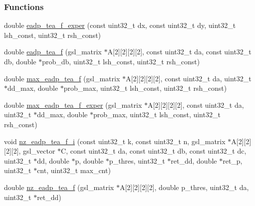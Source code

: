 \subsubsection*{\-Functions}
\begin{DoxyCompactItemize}
\item 
double \hyperlink{eadp-tea-f_8cc_ae0d8d129c4fcabd34fae362f4785cca2}{eadp\-\_\-tea\-\_\-f\-\_\-exper} (const uint32\-\_\-t dx, const uint32\-\_\-t dy, uint32\-\_\-t lsh\-\_\-const, uint32\-\_\-t rsh\-\_\-const)
\item 
double \hyperlink{eadp-tea-f_8cc_a2b46cad5e0dd22f116160ef8fde6e15f}{eadp\-\_\-tea\-\_\-f} (gsl\-\_\-matrix $\ast$\-A\mbox{[}2\mbox{]}\mbox{[}2\mbox{]}\mbox{[}2\mbox{]}\mbox{[}2\mbox{]}, const uint32\-\_\-t da, const uint32\-\_\-t db, double $\ast$prob\-\_\-db, uint32\-\_\-t lsh\-\_\-const, uint32\-\_\-t rsh\-\_\-const)
\item 
double \hyperlink{eadp-tea-f_8cc_afecdbe906e7af3483f251d65512f85f7}{max\-\_\-eadp\-\_\-tea\-\_\-f} (gsl\-\_\-matrix $\ast$\-A\mbox{[}2\mbox{]}\mbox{[}2\mbox{]}\mbox{[}2\mbox{]}\mbox{[}2\mbox{]}, const uint32\-\_\-t da, uint32\-\_\-t $\ast$dd\-\_\-max, double $\ast$prob\-\_\-max, uint32\-\_\-t lsh\-\_\-const, uint32\-\_\-t rsh\-\_\-const)
\item 
double \hyperlink{eadp-tea-f_8cc_a677d6b3bc42aae321e2f4a3ec91640d5}{max\-\_\-eadp\-\_\-tea\-\_\-f\-\_\-exper} (gsl\-\_\-matrix $\ast$\-A\mbox{[}2\mbox{]}\mbox{[}2\mbox{]}\mbox{[}2\mbox{]}\mbox{[}2\mbox{]}, const uint32\-\_\-t da, uint32\-\_\-t $\ast$dd\-\_\-max, double $\ast$prob\-\_\-max, uint32\-\_\-t lsh\-\_\-const, uint32\-\_\-t rsh\-\_\-const)
\item 
void \hyperlink{eadp-tea-f_8cc_a934bdfebbd560419bbe519ce81d27bcf}{nz\-\_\-eadp\-\_\-tea\-\_\-f\-\_\-i} (const uint32\-\_\-t k, const uint32\-\_\-t n, gsl\-\_\-matrix $\ast$\-A\mbox{[}2\mbox{]}\mbox{[}2\mbox{]}\mbox{[}2\mbox{]}\mbox{[}2\mbox{]}, gsl\-\_\-vector $\ast$\-C, const uint32\-\_\-t da, const uint32\-\_\-t db, const uint32\-\_\-t dc, uint32\-\_\-t $\ast$dd, double $\ast$p, double $\ast$p\-\_\-thres, uint32\-\_\-t $\ast$ret\-\_\-dd, double $\ast$ret\-\_\-p, uint32\-\_\-t $\ast$cnt, uint32\-\_\-t max\-\_\-cnt)
\item 
double \hyperlink{eadp-tea-f_8cc_a288ad628f2a68f2f32c7c065a2c87e82}{nz\-\_\-eadp\-\_\-tea\-\_\-f} (gsl\-\_\-matrix $\ast$\-A\mbox{[}2\mbox{]}\mbox{[}2\mbox{]}\mbox{[}2\mbox{]}\mbox{[}2\mbox{]}, double p\-\_\-thres, uint32\-\_\-t da, uint32\-\_\-t $\ast$ret\-\_\-dd)
\end{DoxyCompactItemize}


